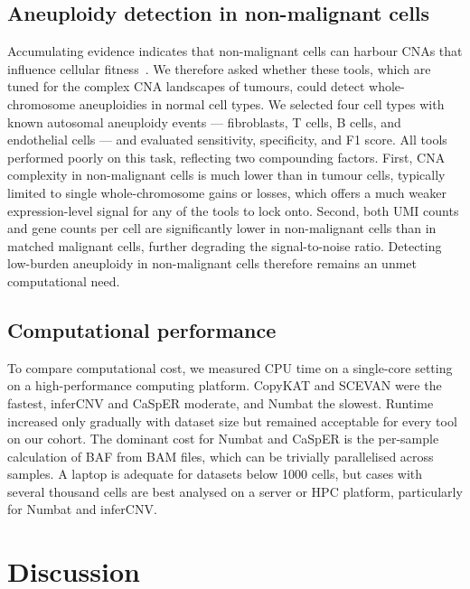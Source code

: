 \documentclass[11pt]{article}
\begin{document}
\subsection{Aneuploidy detection in non-malignant cells}

Accumulating evidence indicates that non-malignant cells can harbour CNAs
that influence cellular fitness~\cite{zhou2020singlecell}. We therefore
asked whether these tools, which are tuned for the complex CNA landscapes
of tumours, could detect whole-chromosome aneuploidies in normal cell types.
We selected four cell types with known autosomal aneuploidy events ---
fibroblasts, T cells, B cells, and endothelial cells --- and evaluated
sensitivity, specificity, and F1 score. All tools performed poorly on this
task, reflecting two compounding factors. First, CNA complexity in
non-malignant cells is much lower than in tumour cells, typically limited to
single whole-chromosome gains or losses, which offers a much weaker
expression-level signal for any of the tools to lock onto. Second, both UMI
counts and gene counts per cell are significantly lower in non-malignant
cells than in matched malignant cells, further degrading the
signal-to-noise ratio. Detecting low-burden aneuploidy in non-malignant
cells therefore remains an unmet computational need.

\subsection{Computational performance}

To compare computational cost, we measured CPU time on a single-core setting
on a high-performance computing platform. CopyKAT and SCEVAN were the
fastest, inferCNV and CaSpER moderate, and Numbat the slowest. Runtime
increased only gradually with dataset size but remained acceptable for every
tool on our cohort. The dominant cost for Numbat and CaSpER is the
per-sample calculation of BAF from BAM files, which can be trivially
parallelised across samples. A laptop is adequate for datasets below 1000
cells, but cases with several thousand cells are best analysed on a server
or HPC platform, particularly for Numbat and inferCNV.

\section{Discussion}
\end{document}
